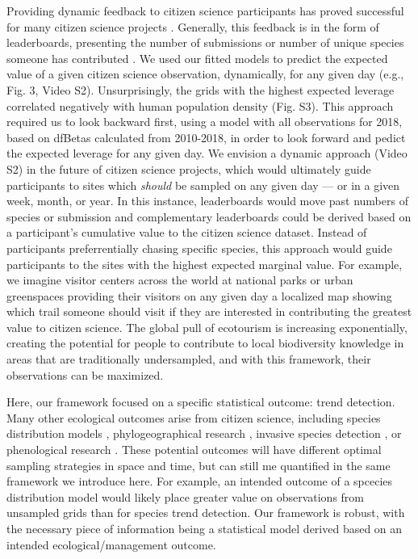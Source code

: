 \documentclass[9pt,twocolumn,twoside,lineno]{pnas-new}
\begin{document}
Providing dynamic feedback to citizen science participants has proved successful for many citizen science projects \cite{rowley2019frogid, wiggins2011conservation, xue2016avicaching}. Generally, this feedback is in the form of leaderboards, presenting the number of submissions or number of unique species someone has contributed \cite{wood2011ebird}. We used our fitted models to predict the expected value of a given citizen science observation, dynamically, for any given day (e.g., Fig. 3, Video S2). Unsurprisingly, the grids with the highest expected leverage correlated negatively with human population density (Fig. S3). This approach required us to look backward first, using a model with all observations for 2018, based on dfBetas calculated from 2010-2018, in order to look forward and pedict the expected leverage for any given day. We envision a dynamic approach (Video S2) in the future of citizen science projects, which would ultimately guide participants to sites which \textit{should} be sampled on any given day --- or in a given week, month, or year. In this instance, leaderboards would move past numbers of species or submission and complementary leaderboards could be derived based on a participant's cumulative value to the citizen science dataset. Instead of participants preferrentially chasing specific species, this approach would guide participants to the sites with the highest expected marginal value. For example, we imagine visitor centers across the world at national parks or urban greenspaces providing their visitors on any given day a localized map showing which trail someone should visit if they are interested in contributing the greatest value to citizen science. The global pull of ecotourism \cite{sharpley2006ecotourism} is increasing exponentially, creating the potential for people to contribute to local biodiversity knowledge in areas that are traditionally undersampled, and with this framework, their observations can be maximized.

Here, our framework focused on a specific statistical outcome: trend detection. Many other ecological outcomes arise from citizen science, including species distribution models \cite{bradsworth2017species, van2013opportunistic}, phylogeographical research \cite{bahls2014new, drury2019continent}, invasive species detection \cite{pocock2017citizen, grason2018citizen}, or phenological research \cite{la2014role, supp2015citizen}. These potential outcomes will have different optimal sampling strategies in space and time, but can still me quantified in the same framework we introduce here. For example, an intended outcome of a spcecies distribution model would likely place greater value on observations from unsampled grids \cite{crawley2001scale} than for species trend detection. Our framework is robust, with the necessary piece of information being a statistical model derived based on an intended ecological/management outcome.
\end{document}
